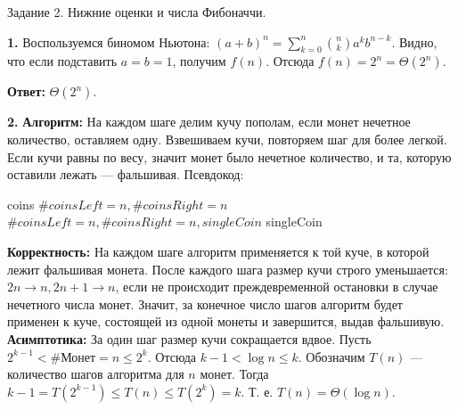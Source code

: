 \documentclass{article}
\begin{document}
\begin{center}
  \Large {Задание 2. Нижние оценки и числа Фибоначчи.}
\end{center}

\bigskip

\textbf{1.}
Воспользуемся биномом Ньютона: \( (a+b)^n =
\sum\limits_{k=0}^n{n\choose k} a^k b^{n-k} \). Видно, что если
подставить \( a = b = 1 \), получим \( f(n) \). Отсюда \( f(n) = 2^n
= \Theta (2^n) \).

\textbf{Ответ: }\( \Theta (2^n) \).
\medskip

\textbf{2.} \textbf{Алгоритм:} На каждом шаге делим кучу пополам,
если монет нечетное
количество, оставляем одну. Взвешиваем кучи, повторяем шаг для более
легкой. Если кучи равны по весу, значит монет было нечетное количество, и та,
которую оставили лежать --- фальшивая. Псевдокод:
\begin{algorithmic}[1]
  \State \Return coins
  \State \( \# coinsLeft = n, \#coinsRight = n \)
  \State {}
  \Else
  \State {}
  \EndIf
  \State \( \# coinsLeft = n, \#coinsRight = n, singleCoin \)
  \State {}
  \State {}
  \Else
  \State \Return singleCoin
  \EndIf
  \EndIf  \EndFunction
\end{algorithmic}
\textbf{Корректность: }На каждом шаге алгоритм применяется к той
куче, в которой лежит фальшивая монета. После каждого шага размер
кучи строго уменьшается: \( 2n \rightarrow n, 2n+1 \rightarrow n \),
если не происходит преждевременной остановки в случае нечетного числа
монет. Значит, за конечное число шагов алгоритм будет применен к
куче, состоящей из одной монеты и завершится, выдав фальшивую.
\\
\textbf{Асимптотика: } За один шаг размер кучи сокращается вдвое.
Пусть \( 2^{k-1} <\#\text{Монет} = n \le 2^k \). Отсюда \( k-1<\log n \le k \).
Обозначим \( T(n) \) --- количество шагов алгоритма для \( n \)
монет. Тогда \( k-1=T(2^{k-1})\le T(n) \le T(2^k) = k \). Т. е. \(
T(n) = \Theta(\log n) \).
\end{document}
